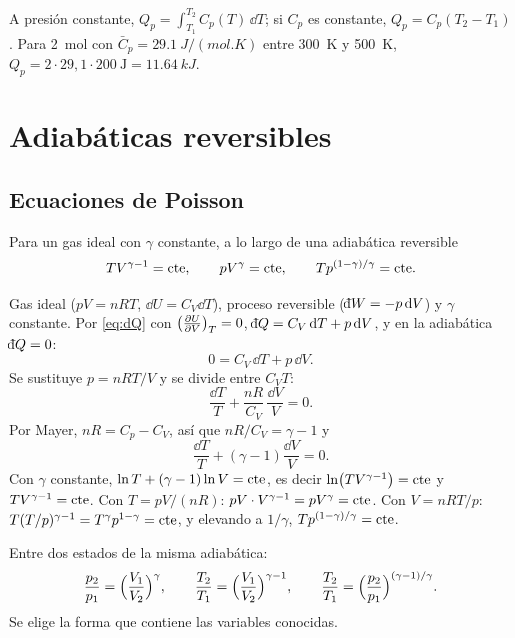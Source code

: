\begin{ejemplo}
A presión constante, $Q_p=\int_{T_1}^{T_2}C_p(T)\,\dd T$; si $C_p$ es constante, $Q_p=C_p(T_2-T_1)$. Para
\SI{2}{mol} con $\bar C_p=\SI{29,1}{J/(mol.K)}$ entre \SI{300}{K} y \SI{500}{K},
$Q_p=2\cdot29{,}1\cdot200\ \mathrm{J}=\SI{11,64}{kJ}$.
\end{ejemplo}

\section{Adiabáticas reversibles}

\subsection{Ecuaciones de Poisson}

\begin{proposicion}
Para un gas ideal con $\gamma$ constante, a lo largo de una adiabática reversible
\begin{equation}\label{eq:poisson}
  TV^{\gamma-1}=\mathrm{cte},\qquad pV^{\gamma}=\mathrm{cte},\qquad Tp^{(1-\gamma)/\gamma}=\mathrm{cte} .
\end{equation}
\end{proposicion}

\begin{demostracion}
 Gas ideal ($pV=nRT$, $\dd U=C_V\dd T$), proceso reversible ($\dbar W=-p\,\dd V$) y $\gamma$
constante.
 Por \eqref{eq:dQ} con $\bigl(\tfrac{\partial U}{\partial V}\bigr)_{T}=0$, $\dbar Q=C_V\,\dd T+p\,\dd V$, y en la adiabática
$\dbar Q=0$:
\[
  0=C_V\,\dd T+p\,\dd V .
\]
 Se sustituye $p=nRT/V$ y se divide entre $C_VT$:
\[
  \frac{\dd T}{T}+\frac{nR}{C_V}\,\frac{\dd V}{V}=0 .
\]
Por Mayer, $nR=C_p-C_V$, así que $nR/C_V=\gamma-1$ y
\[
  \frac{\dd T}{T}+(\gamma-1)\frac{\dd V}{V}=0 .
\]
 Con $\gamma$ constante, $\ln T+(\gamma-1)\ln V=\mathrm{cte}$, es decir
$\ln\bigl(TV^{\gamma-1}\bigr)=\mathrm{cte}$ y $TV^{\gamma-1}=\mathrm{cte}$.
 Con $T=pV/(nR)$: $pV\cdot V^{\gamma-1}=pV^{\gamma}=\mathrm{cte}$. Con $V=nRT/p$:
$T(T/p)^{\gamma-1}=T^{\gamma}p^{1-\gamma}=\mathrm{cte}$, y elevando a $1/\gamma$, $Tp^{(1-\gamma)/\gamma}=\mathrm{cte}$.
\end{demostracion}

Entre dos estados de la misma adiabática:
\begin{equation}\label{eq:poisson2}
  \frac{p_2}{p_1}=\Bigl(\frac{V_1}{V_2}\Bigr)^{\gamma},\qquad
  \frac{T_2}{T_1}=\Bigl(\frac{V_1}{V_2}\Bigr)^{\gamma-1},\qquad
  \frac{T_2}{T_1}=\Bigl(\frac{p_2}{p_1}\Bigr)^{(\gamma-1)/\gamma}.
\end{equation}
Se elige la forma que contiene las variables conocidas.

